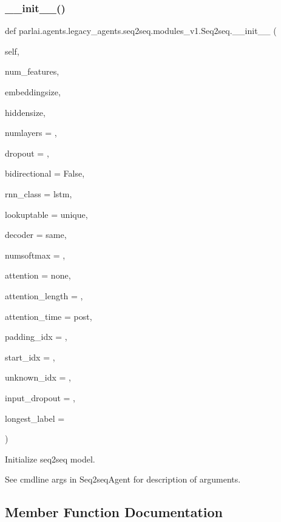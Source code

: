 \subsubsection{\texorpdfstring{\+\_\+\+\_\+init\+\_\+\+\_\+()}{\_\_init\_\_()}}
{\footnotesize\ttfamily def parlai.\+agents.\+legacy\+\_\+agents.\+seq2seq.\+modules\+\_\+v1.\+Seq2seq.\+\_\+\+\_\+init\+\_\+\+\_\+ (\begin{DoxyParamCaption}\item[{}]{self,  }\item[{}]{num\+\_\+features,  }\item[{}]{embeddingsize,  }\item[{}]{hiddensize,  }\item[{}]{numlayers = {},  }\item[{}]{dropout = {},  }\item[{}]{bidirectional = {\ttfamily False},  }\item[{}]{rnn\+\_\+class = {\ttfamily \textquotesingle{}lstm\textquotesingle{}},  }\item[{}]{lookuptable = {\ttfamily \textquotesingle{}unique\textquotesingle{}},  }\item[{}]{decoder = {\ttfamily \textquotesingle{}same\textquotesingle{}},  }\item[{}]{numsoftmax = {},  }\item[{}]{attention = {\ttfamily \textquotesingle{}none\textquotesingle{}},  }\item[{}]{attention\+\_\+length = {},  }\item[{}]{attention\+\_\+time = {\ttfamily \textquotesingle{}post\textquotesingle{}},  }\item[{}]{padding\+\_\+idx = {},  }\item[{}]{start\+\_\+idx = {},  }\item[{}]{unknown\+\_\+idx = {},  }\item[{}]{input\+\_\+dropout = {},  }\item[{}]{longest\+\_\+label = {} }\end{DoxyParamCaption})}

\begin{DoxyVerb}Initialize seq2seq model.

See cmdline args in Seq2seqAgent for description of arguments.
\end{DoxyVerb}
 

\subsection{Member Function Documentation}
\mbox{\label{classparlai_1_1agents_1_1legacy__agents_1_1seq2seq_1_1modules__v1_1_1Seq2seq_a59af567499dfa8e60ccc185391143d41}} 
